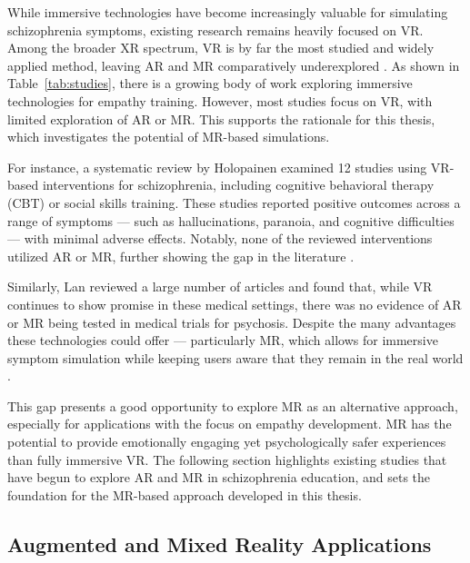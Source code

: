 \vspace{1em}

While immersive technologies have become increasingly valuable for simulating schizophrenia symptoms, existing research remains heavily focused on VR. Among the broader XR spectrum, VR is by far the most studied and widely applied method, leaving AR and MR comparatively underexplored \cite{Kuhail2022}. As shown in Table~\ref{tab:studies}, there is a growing body of work exploring immersive technologies for empathy training. However, most studies focus on VR, with limited exploration of AR or MR. This supports the rationale for this thesis, which investigates the potential of MR-based simulations.

\vspace{1em}

For instance, a systematic review by Holopainen \cite{Holopainen2023} examined 12 studies using VR-based interventions for schizophrenia, including cognitive behavioral therapy (CBT) or social skills training. These studies reported positive outcomes across a range of symptoms — such as hallucinations, paranoia, and cognitive difficulties — with minimal adverse effects. Notably, none of the reviewed interventions utilized AR or MR, further showing the gap in the literature \cite{Holopainen2023}.

\vspace{1em}

Similarly, Lan \cite{Lan2023} reviewed a large number of articles and found that, while VR continues to show promise in these medical settings, there was no evidence of AR or MR being tested in medical trials for psychosis. Despite the many advantages these technologies could offer — particularly MR, which allows for immersive symptom simulation while keeping users aware that they remain in the real world \cite{Lan2023}.

This gap presents a good opportunity to explore MR as an alternative approach, especially for applications with the focus on empathy development. MR has the potential to provide emotionally engaging yet psychologically safer experiences than fully immersive VR. The following section highlights existing studies that have begun to explore AR and MR in schizophrenia education, and sets the foundation for the MR-based approach developed in this thesis.

\subsection{Augmented and Mixed Reality Applications}

